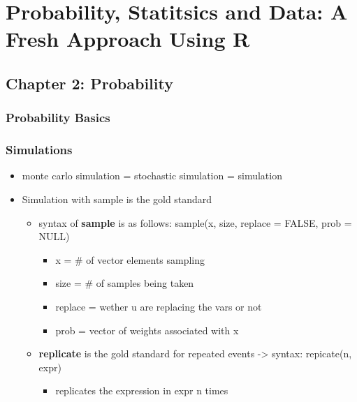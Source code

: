 \documentclass[
]{article}
\author{}
\date{\vspace{-2.5em}}
\providecommand{\tightlist}{%
  \setlength{\itemsep}{0pt}\setlength{\parskip}{0pt}}
\begin{document}
\hypertarget{probability-statitsics-and-data-a-fresh-approach-using-r}{%
\section{Probability, Statitsics and Data: A Fresh Approach Using
R}\label{probability-statitsics-and-data-a-fresh-approach-using-r}}

\hypertarget{chapter-2-probability}{%
\subsection{Chapter 2: Probability}\label{chapter-2-probability}}

\hypertarget{probability-basics}{%
\subsubsection{Probability Basics}\label{probability-basics}}

\hypertarget{simulations}{%
\subsubsection{Simulations}\label{simulations}}

\begin{itemize}
\tightlist
\item
  monte carlo simulation = stochastic simulation = simulation
\item
  Simulation with sample is the gold standard

  \begin{itemize}
  \tightlist
  \item
    syntax of \textbf{sample} is as follows: sample(x, size, replace =
    FALSE, prob = NULL)

    \begin{itemize}
    \tightlist
    \item
      x = \# of vector elements sampling
    \item
      size = \# of samples being taken
    \item
      replace = wether u are replacing the vars or not
    \item
      prob = vector of weights associated with x
    \end{itemize}
  \item
    \textbf{replicate} is the gold standard for repeated events
    -\textgreater{} syntax: repicate(n, expr)

    \begin{itemize}
    \tightlist
    \item
      replicates the expression in expr n times
    \end{itemize}
  \end{itemize}
\end{itemize}
\end{document}

